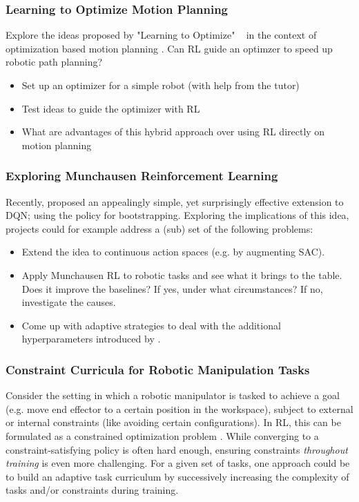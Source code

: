 \documentclass[a4paper]{article}
\begin{document}
\subsubsection{Learning to Optimize Motion Planning}
Explore the ideas proposed by "Learning to Optimize" ~\cite{LiM16b} in the context of optimization based motion planning \cite{Zucker2013}. Can RL guide an optimzer to speed up robotic path planning?

\begin{itemize}
    \item Set up an optimizer for a simple robot (with help from the tutor)
    \item Test ideas to guide the optimizer with RL
    \item What are advantages of this hybrid approach over using RL directly on motion planning
    \end{itemize}

\subsubsection{Exploring Munchausen Reinforcement Learning}
Recently, \cite{vieillard2020munchausen} proposed an appealingly simple, yet surprisingly effective extension to DQN; using the policy for bootstrapping. Exploring the implications of this idea, projects could for example address a (sub) set of the following problems:

\begin{itemize}
	\item Extend the idea to continuous action spaces (e.g. by augmenting SAC).
	\item Apply Munchausen RL to robotic tasks and see what it brings to the table. Does it improve the baselines? If yes, under what circumstances? If no, investigate the causes.
	\item Come up with adaptive strategies to deal with the additional hyperparameters introduced by \cite{vieillard2020munchausen}.
\end{itemize}

\subsubsection{Constraint Curricula for Robotic Manipulation Tasks}
Consider the setting in which a robotic manipulator is tasked to achieve a goal (e.g. move end effector to a certain position in the workspace), subject to external or internal constraints (like avoiding certain configurations). In RL, this can be formulated as a constrained optimization problem \cite{Achiam2019BenchmarkingSE}. While converging to a constraint-satisfying policy is often hard enough, ensuring constraints \textit{throughout training} is even more challenging. For a given set of tasks, one approach could be to build an adaptive task curriculum by successively increasing the complexity of tasks and/or constraints during training.
\end{document}
